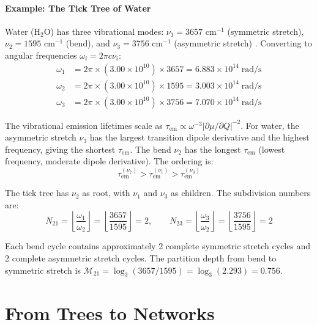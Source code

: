 \documentclass[11pt,twocolumn,a4paper]{article}
\theoremstyle{definition}
\theoremstyle{remark}
\newcommand{\Depth}{\mathcal{M}}
\newcommand{\tem}{\tau_{\mathrm{em}}}
\begin{document}
\subsection{Example: The Tick Tree of Water}

Water (H$_2$O) has three vibrational modes: $\nu_1 = 3657$ cm$^{-1}$ (symmetric stretch), $\nu_2 = 1595$ cm$^{-1}$ (bend), and $\nu_3 = 3756$ cm$^{-1}$ (asymmetric stretch) \citep{shimanouchi1972, nist_webbook}. Converting to angular frequencies $\omega_i = 2\pi c \nu_i$:
\begin{align}
\omega_1 &= 2\pi \times (3.00 \times 10^{10}) \times 3657 = 6.883 \times 10^{14} \;\mathrm{rad/s} \\
\omega_2 &= 2\pi \times (3.00 \times 10^{10}) \times 1595 = 3.003 \times 10^{14} \;\mathrm{rad/s} \\
\omega_3 &= 2\pi \times (3.00 \times 10^{10}) \times 3756 = 7.070 \times 10^{14} \;\mathrm{rad/s}
\end{align}

The vibrational emission lifetimes scale as $\tem \propto \omega^{-3} |\partial\mu/\partial Q|^{-2}$. For water, the asymmetric stretch $\nu_3$ has the largest transition dipole derivative and the highest frequency, giving the shortest $\tem$. The bend $\nu_2$ has the longest $\tem$ (lowest frequency, moderate dipole derivative). The ordering is:
\begin{equation}
\tem^{(\nu_2)} > \tem^{(\nu_1)} > \tem^{(\nu_3)}
\end{equation}

The tick tree has $\nu_2$ as root, with $\nu_1$ and $\nu_3$ as children. The subdivision numbers are:
\begin{equation}
N_{21} = \left\lfloor \frac{\omega_1}{\omega_2} \right\rfloor = \left\lfloor \frac{3657}{1595} \right\rfloor = 2, \qquad
N_{23} = \left\lfloor \frac{\omega_3}{\omega_2} \right\rfloor = \left\lfloor \frac{3756}{1595} \right\rfloor = 2
\end{equation}

Each bend cycle contains approximately 2 complete symmetric stretch cycles and 2 complete asymmetric stretch cycles. The partition depth from bend to symmetric stretch is $\Depth_{21} = \log_3(3657/1595) = \log_3(2.293) = 0.756$.


\part{From Trees to Networks}
\end{document}

